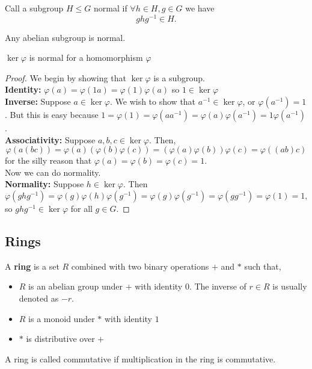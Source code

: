 \begin{df}
Call a subgroup $H \leq G$ normal if $\forall h \in H, g \in G$ we have
\[ ghg^{-1} \in H. \]
\end{df}
\begin{rem}
Any abelian subgroup is normal.
\end{rem}
\begin{prop}
$\ker \varphi$ is normal for a homomorphism $\varphi$
\end{prop}
\begin{proof}
We begin by showing that $\ker \varphi$ is a subgroup. \\
\textbf{Identity:} $\varphi(a) = \varphi(1a) = \varphi(1) \varphi(a)$ so
$1 \in \ker \varphi$ \\
\textbf{Inverse:} Suppose $a \in \ker \varphi$. We wish to show that
$a^{-1} \in \ker \varphi$, or $\varphi(a^{-1}) = 1$. But this is easy
because $1 = \varphi(1) = \varphi(aa^{-1}) = \varphi(a) \varphi(a^{-1})
= 1 \varphi(a^{-1})$. \\
\textbf{Associativity:} Suppose $a, b, c \in \ker \varphi$. Then,
\[ \varphi(a(bc)) = \varphi(a)(\varphi(b)\varphi(c)) =
(\varphi(a)\varphi(b))\varphi(c) = \varphi((ab)c) \]
for the silly reason that $\varphi(a) = \varphi(b) = \varphi(c) = 1$. \\
Now we can do normality. \\
\textbf{Normality:} Suppose $h \in \ker \varphi$. Then
\[ \varphi(ghg^{-1}) = \varphi(g)\varphi(h)\varphi(g^{-1}) = \varphi(g)
\varphi(g^{-1}) = \varphi(g g^{-1}) = \varphi(1) = 1, \]
so $ghg^{-1} \in \ker \varphi$ for all $g \in G$.
\end{proof}

\subsection{Rings}
\begin{df}
A \textbf{ring} is a set $R$ combined with two binary operations $+$ and
$*$ such that,
\begin{itemize}
\item $R$ is an abelian group under $+$ with identity $0$. The inverse
of $r \in R$ is usually denoted as $-r$.
\item $R$ is a monoid under $*$ with identity $1$
\item $*$ is distributive over $+$
\end{itemize}
\end{df}

\begin{df}
A ring is called commutative if multiplication in the ring is
commutative.
\end{df}

